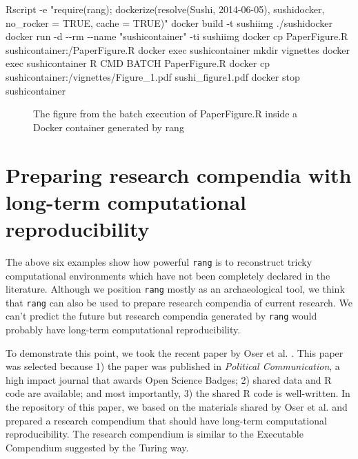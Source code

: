 \documentclass[
  10pt,
  letterpaper,
]{article}
\newenvironment{Shaded}{\begin{snugshade}}{\end{snugshade}}
\newcommand{\AttributeTok}[1]{\textcolor[rgb]{0.40,0.45,0.13}{#1}}
\newcommand{\ExtensionTok}[1]{\textcolor[rgb]{0.00,0.23,0.31}{#1}}
\newcommand{\NormalTok}[1]{\textcolor[rgb]{0.00,0.23,0.31}{#1}}
\newcommand{\StringTok}[1]{\textcolor[rgb]{0.13,0.47,0.30}{#1}}
\begin{document}
\begin{Shaded}
\begin{Highlighting}[]
\ExtensionTok{Rscript} \AttributeTok{{-}e} \StringTok{"require(rang); dockerize(resolve(\textquotesingle{}Sushi\textquotesingle{}, \textquotesingle{}2014{-}06{-}05\textquotesingle{}),}
\StringTok{\textquotesingle{}sushidocker\textquotesingle{}, no\_rocker = TRUE, cache = TRUE)"}
\ExtensionTok{docker}\NormalTok{ build }\AttributeTok{{-}t}\NormalTok{ sushiimg ./sushidocker}
\ExtensionTok{docker}\NormalTok{ run }\AttributeTok{{-}d} \AttributeTok{{-}{-}rm} \AttributeTok{{-}{-}name} \StringTok{"sushicontainer"} \AttributeTok{{-}ti}\NormalTok{ sushiimg}
\ExtensionTok{docker}\NormalTok{ cp PaperFigure.R sushicontainer:/PaperFigure.R}
\ExtensionTok{docker}\NormalTok{ exec sushicontainer mkdir vignettes}
\ExtensionTok{docker}\NormalTok{ exec sushicontainer R CMD BATCH PaperFigure.R}
\ExtensionTok{docker}\NormalTok{ cp sushicontainer:/vignettes/Figure\_1.pdf sushi\_figure1.pdf}
\ExtensionTok{docker}\NormalTok{ stop sushicontainer}
\end{Highlighting}
\end{Shaded}

\begin{figure}[!h]
\caption{The figure from the batch execution of PaperFigure.R inside a Docker container generated by rang}
\label{fig2}
\end{figure}

\hypertarget{preparing-research-compendia-with-long-term-computational-reproducibility}{%
\section{Preparing research compendia with long-term computational
reproducibility}\label{preparing-research-compendia-with-long-term-computational-reproducibility}}

The above six examples show how powerful \texttt{rang} is to reconstruct
tricky computational environments which have not been completely
declared in the literature. Although we position \texttt{rang} mostly as
an archaeological tool, we think that \texttt{rang} can also be used to
prepare research compendia of current research. We can't predict the
future but research compendia generated by \texttt{rang} would probably
have long-term computational reproducibility.

To demonstrate this point, we took the recent paper by Oser et al.
\citep{oser:2022:HPE}. This paper was selected because 1) the paper was
published in \emph{Political Communication}, a high impact journal that
awards Open Science Badges; 2) shared data and R code are available; and
most importantly, 3) the shared R code is well-written. In the
repository of this paper, we based on the materials shared by Oser et
al. \citep{oser:2022:HPE} and prepared a research compendium that should
have long-term computational reproducibility. The research compendium is
similar to the Executable Compendium suggested by the Turing way.
\end{document}
